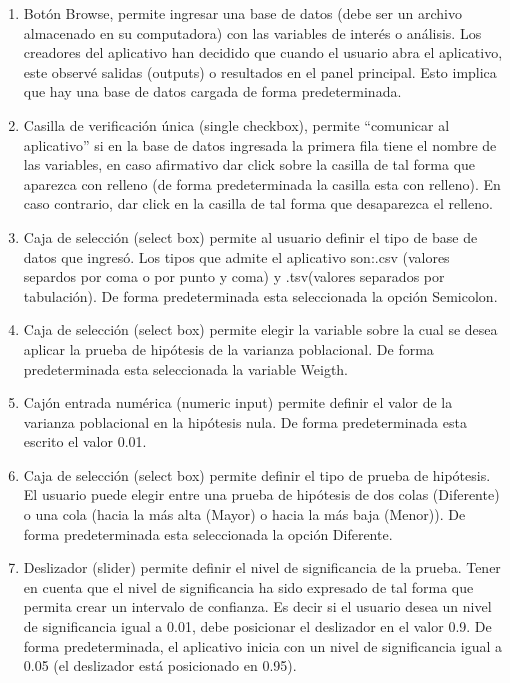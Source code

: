 \documentclass[]{comunicaciones}
\begin{document}
\begin{enumerate}
\item Botón Browse, permite ingresar una base de datos (debe ser un archivo almacenado en su computadora) con las variables de interés o análisis. Los creadores del aplicativo han decidido que cuando el usuario abra el aplicativo, este observé salidas (outputs) o resultados en el panel principal. Esto implica que hay una base de datos cargada de forma predeterminada.

\item Casilla de verificación única (single checkbox), permite “comunicar al aplicativo” si en la base de datos ingresada la primera fila tiene el nombre de las variables, en caso afirmativo dar click sobre la casilla de tal forma que aparezca con relleno (de forma predeterminada la casilla esta con relleno). En caso contrario, dar click en la casilla de tal forma que desaparezca el relleno.

\item Caja de selección (select box) permite al usuario definir el tipo de base de datos que ingresó. Los tipos que admite el aplicativo son:.csv (valores separdos por coma o por punto y coma) y .tsv(valores separados por tabulación). De forma predeterminada esta seleccionada la opción Semicolon.

\item Caja de selección (select box) permite elegir la variable sobre la cual se desea aplicar la prueba de hipótesis de la varianza poblacional. De forma predeterminada esta seleccionada la variable Weigth.

\item Cajón entrada numérica (numeric input) permite definir el valor de la varianza poblacional en la hipótesis nula. De forma predeterminada esta escrito el valor 0.01.

\item Caja de selección (select box) permite definir el tipo de prueba de hipótesis. El usuario puede elegir entre una prueba de hipótesis de dos colas (Diferente) o una cola (hacia la más alta (Mayor) o hacia la más baja (Menor)). De forma predeterminada esta seleccionada la opción Diferente.

\item Deslizador (slider) permite definir el nivel de significancia de la prueba. Tener en cuenta que el nivel de significancia ha sido expresado de tal forma que permita crear un intervalo de confianza. Es decir si el usuario desea un nivel de significancia igual a 0.01, debe posicionar el deslizador en el valor 0.9. De forma predeterminada, el aplicativo inicia con un nivel de significancia igual a 0.05 (el deslizador está posicionado en 0.95).
\end{enumerate}
\end{document}
